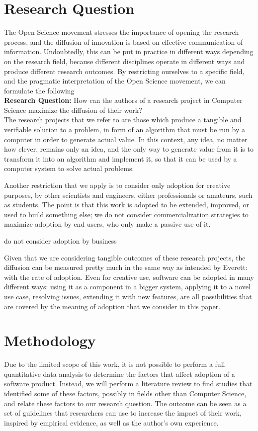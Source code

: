 \documentclass[12pt]{article}
\begin{document}
\section{Research Question}
\label{sec:org9923660}
The Open Science movement stresses the importance of opening the research process, and the diffusion of innovation is based on effective communication of information. Undoubtedly, this can be put in practice in different ways depending on the research field, because different disciplines operate in different ways and produce different research outcomes. By restricting ourselves to a specific field, and the pragmatic interpretation of the Open Science movement, we can formulate the following \\

\textbf{Research Question:} How can the authors of a research project in Computer Science maximize the diffusion of their work? \\

The research projects that we refer to are those which produce a tangible and verifiable solution to a problem, in form of an algorithm that must be run by a computer in order to generate actual value. In this context, any idea, no matter how clever, remains only an idea, and the only way to generate value from it is to transform it into an algorithm and implement it, so that it can be used by a computer system to solve actual problems.

Another restriction that we apply is to consider only adoption for creative purposes, by other scientists and engineers, either professionals or amateurs, such as students. The point is that this work is adopted to be extended, improved, or used to build something else; we do not consider commercialization strategies to maximize adoption by end users, who only make a passive use of it.

do not consider adoption by business

Given that we are considering tangible outcomes of these research projects, the diffusion can be measured pretty much in the same way as intended by Everett: with the rate of adoption. Even for creative use, software can be adopted in many different ways: using it as a component in a bigger system, applying it to a novel use case, resolving issues, extending it with new features, are all possibilities that are covered by the meaning of adoption that we consider in this paper.

\section{Methodology}
\label{sec:orgbab015d}
Due to the limited scope of this work, it is not possible to perform a full quantitative data analysis to determine the factors that affect adoption of a software product. Instead, we will perform a literature review to find studies that identified some of these factors, possibly in fields other than Computer Science, and relate these factors to our research question. The outcome can be seen as a set of guidelines that researchers can use to increase the impact of their work, inspired by empirical evidence, as well as the author's own experience. 
\end{document}
